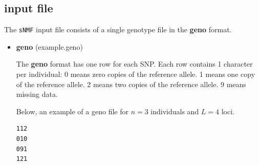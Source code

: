 \documentclass[10pt,a4paper]{article}
\begin{document}
\subsection{input file}
The {\tt sNMF} input file consists of a single genotype file in the {\bf geno} format. 
\begin{itemize}
\item {\bf geno} (example.geno)

The {\bf geno} format has one row for each SNP.
  Each row contains 1 character per individual:
  0 means zero copies of the reference allele.
  1 means one copy of the reference allele.
  2 means two copies of the reference allele.
  9 means missing data.

Below, an example of a geno file for $n=3$ individuals and $L=4$ loci.
\begin{center}
\footnotesize
\begin{Verbatim}[frame=single]
112
010
091
121
\end{Verbatim}
\end{center}
\end{itemize}
\end{document}
